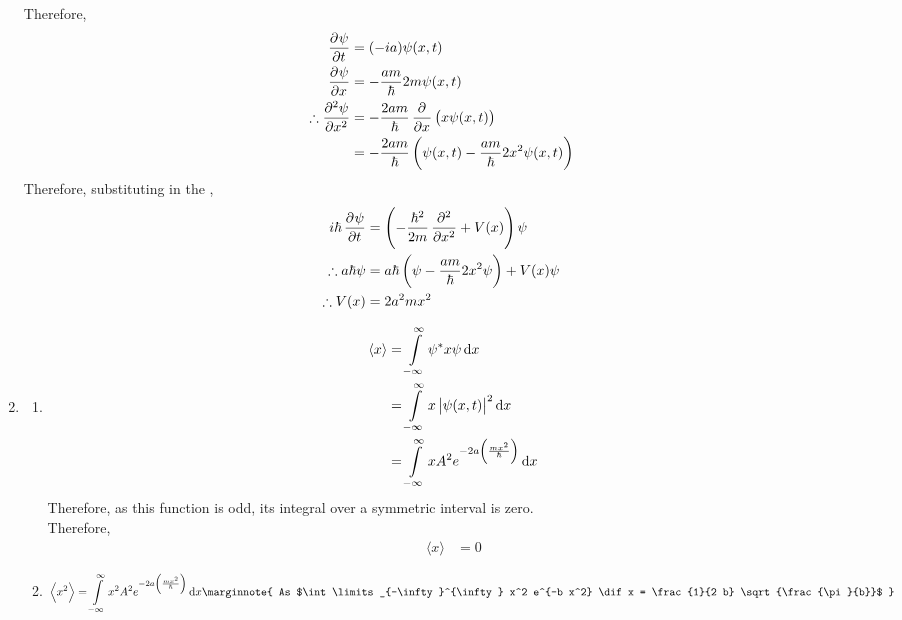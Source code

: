 \documentclass[titlepage, fleqn, a4paper, 12pt, twoside]{article}
\theoremstyle{definition}
\theoremstyle{theorem}
\begin{document}
\begin{solution}
\begin{enumerate}[leftmargin=*]
			Therefore,
			\begin{align*}
				\dpd{\psi}{t}               & = (-i a) \psi(x,t)                                         \\
				\dpd{\psi}{x}               & = -\frac{a m}{\hbar} 2 m \psi(x,t)                         \\
				\therefore \dpd[2]{\psi}{x} & = -\frac{2 a m}{\hbar} \dpd{}{x}\left( x \psi(x,t) \right) \\
                                                            & = -\frac{2 a m}{\hbar} \left( \psi(x,t) - \frac{a m}{\hbar} 2 x^2 \psi(x,t) \right)
			\end{align*}
			Therefore, substituting in the ,
			\begin{align*}
				i \hbar \dpd{\psi}{t}   & = \left( -\frac{\hbar^2}{2 m} \dpd[2]{}{x} + V(x) \right) \psi           \\
				\therefore a \hbar \psi & = a \hbar \left( \psi - \frac{a m}{\hbar} 2 x^2 \psi \right) + V(x) \psi \\
				\therefore V(x)         & = 2 a^2 m x^2
			\end{align*}
		\item
			\begin{enumerate}[leftmargin=*]
				\item
					\begin{align*}
						\langle x \rangle & = \int\limits_{-\infty}^{\infty} \psi^* x \psi \dif x                \\
                                                                  & = \int\limits_{-\infty}^{\infty} x \left| \psi(x,t) \right|^2 \dif x \\
                                                                  & = \int\limits_{-\infty}^{\infty} x A^2 e^{-2 a \left( \frac{m x^2}{\hbar} \right)} \dif x
					\end{align*}
					Therefore, as this function is odd, its integral over a symmetric interval is zero.\\
					Therefore,
					\begin{align*}
						\langle x \rangle & = 0
					\end{align*}
				\item
					\begin{align*}
						\left\langle x^2 \right\rangle                                    & = \int\limits_{-\infty}^{\infty} x^2 A^2 e^{-2 a \left( \frac{m x^2}{\hbar} \right)} \dif x
						\marginnote
						{
							As $\int\limits_{-\infty}^{\infty} x^2 e^{-b x^2} \dif x  = \frac{1}{2 b} \sqrt{\frac{\pi}{b}}$
}
\end{align*}
\end{enumerate}
\end{enumerate}
\end{solution}
\end{document}
